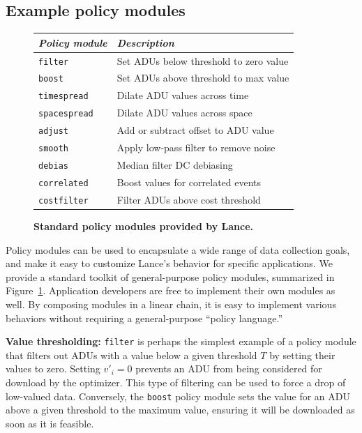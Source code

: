 \documentclass[lettersize]{sig-alternate-konrad}
\begin{document}
\subsection{Example policy modules}
\label{sec-example-policies}

\begin{figure}[t]
\begin{center}
\begin{small}
\begin{tabular}{|l|l|} \hline
{\em Policy module} & {\em Description} \\ \hline
{\tt filter} & Set ADUs below threshold to zero value \\
{\tt boost} & Set ADUs above threshold to max value \\
{\tt timespread} & Dilate ADU values across time \\
{\tt spacespread} & Dilate ADU values across space \\
{\tt adjust} & Add or subtract offset to ADU value \\
{\tt smooth} & Apply low-pass filter to remove noise \\
{\tt debias} & Median filter DC debiasing \\
{\tt correlated} & Boost values for correlated events \\
{\tt costfilter} & Filter ADUs above cost threshold \\ \hline
\end{tabular}
\end{small}
\end{center}
\caption{\small {\bf Standard policy modules provided by Lance.}}
\label{fig-policymodules}
\end{figure}

Policy modules can be used to encapsulate a wide range of 
data collection goals, and make it easy to customize Lance's behavior
for specific applications. We provide a standard toolkit of
general-purpose policy modules, summarized in Figure~\ref{fig-policymodules}.
Application developers are free to implement their own modules as well.
By composing modules in a linear chain, it is easy to implement 
various behaviors without requiring a general-purpose ``policy language.'' 

{\bf Value thresholding:}
{\tt filter} is perhaps the simplest example of a policy module that 
filters out ADUs with a value below a given threshold $T$ by
setting their values to zero.
Setting $v'_i = 0$ prevents an ADU from being considered for download by the
optimizer.  This type of filtering can be used to force a drop of low-valued
data. Conversely, the {\tt boost} policy module sets the value for an ADU
above a given threshold to the maximum value, ensuring it will be downloaded
as soon as it is feasible.
\end{document}
